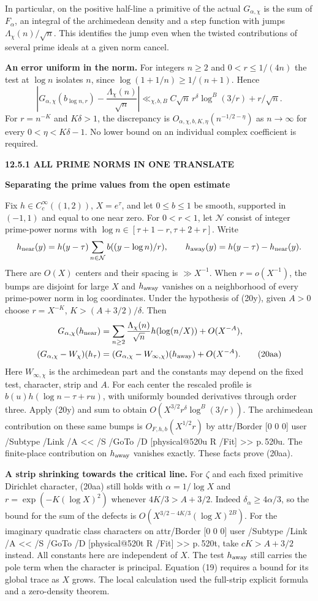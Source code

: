 \documentclass[11pt,letterpaper]{article}
\makeatletter
\newcommand{\rightmarktext}{}
\newcommand{\printfolio}{}
\newcommand{\leaf}[4]{\clearpage\gdef\printfolio{#1}\gdef\rightmarktext{#2}%
  {\small\sffamily\bfseries\color{ink}#3\par}\vspace{3pt}%
  {\LARGE\bfseries #4\par}\vspace{5pt}}
\newcommand{\point}[1]{\par\smallskip\textbf{#1.}\enspace\ignorespaces}
\newcommand{\MusicPDFPageRef}[1]{\pdfpageref\csname physical@#1\endcsname\space\space 0 R}
\newcommand{\pagelink}[2]{\leavevmode\pdfstartlink attr{/Border [0 0 0]} user{%
  /Subtype /Link /A << /S /GoTo /D [\MusicPDFPageRef{#1} /Fit] >>}%
  {\color{ink}#2}\pdfendlink}
\newcommand{\pg}[1]{\pagelink{#1}{p.\,#1}}
\makeatother
\begin{document}
In particular, on the positive half-line a primitive of the actual
$G_{\alpha,\chi}$ is the sum of $F_\alpha$, an integral of the
archimedean density and a step function with jumps
$\Lambda_\chi(n)/\sqrt n$. This identifies the jump even when the
twisted contributions of several prime ideals at a given norm cancel.

\point{An error uniform in the norm}
For integers $n\ge2$ and $0<r\le1/(4n)$ the test at $\log n$
isolates $n$, since $\log(1+1/n)\ge1/(n+1)$. Hence
\[
 \left|G_{\alpha,\chi}(b_{\log n,r})-\frac{\Lambda_\chi(n)}{\sqrt n}\right|
 \ll_{\chi,b,B} C\sqrt n\,r^\delta\log^B(3/r)+r/\sqrt n .
\]
For $r=n^{-K}$ and $K\delta>1$, the discrepancy is
$O_{\alpha,\chi,b,K,\eta}(n^{-1/2-\eta})$ as $n\to\infty$ for every
$0<\eta<K\delta-1$. No lower bound on an individual complex
coefficient is required.

\leaf{520v}{The complementary test}{12.5.1 \quad ALL PRIME NORMS IN ONE TRANSLATE}{Separating the prime values from the open estimate}
Fix $h\in C_c^\infty((1,2))$, $X=e^\tau$, and let $0\le b\le1$ be
smooth, supported in $(-1,1)$ and equal to one near zero. For $0<r<1$,
let $\mathcal N$ consist of integer prime-power norms with
$\log n\in[\tau+1-r,\tau+2+r]$. Write
\[
 h_{\rm near}(y)=h(y-\tau)\sum_{n\in\mathcal N}b((y-\log n)/r),
 \qquad h_{\rm away}(y)=h(y-\tau)-h_{\rm near}(y).
\]
There are $O(X)$ centers and their spacing is $\gg X^{-1}$.
When $r=o(X^{-1})$, the bumps are disjoint for large $X$ and
$h_{\rm away}$ vanishes on a neighborhood of every prime-power norm
in log coordinates. Under the hypothesis of (20y), given $A>0$ choose
$r=X^{-K}$, $K>(A+3/2)/\delta$. Then
\begin{align*}
 G_{\alpha,\chi}(h_{\rm near})
   &=\sum_{n\ge2}\frac{\Lambda_\chi(n)}{\sqrt n}h(\log(n/X))+O(X^{-A}),\\
 (G_{\alpha,\chi}-W_\chi)(h_\tau)
   &=(G_{\alpha,\chi}-W_{\infty,\chi})(h_{\rm away})+O(X^{-A}).
 \tag{20aa}
\end{align*}
Here $W_{\infty,\chi}$ is the archimedean part and the constants may
depend on the fixed test, character, strip and $A$. For each center
the rescaled profile is $b(u)h(\log n-\tau+ru)$, with uniformly
bounded derivatives through order three. Apply (20y) and sum to obtain
$O(X^{3/2}r^\delta\log^B(3/r))$. The archimedean contribution on
these same bumps is $O_{F,h,b}(X^{1/2}r)$ by \pg{520u}. The finite-place
contribution on $h_{\rm away}$ vanishes exactly. These facts prove (20aa).

\point{A strip shrinking towards the critical line}
For $\zeta$ and each fixed primitive Dirichlet character, (20aa) still
holds with $\alpha=1/\log X$ and $r=\exp(-K(\log X)^2)$ whenever
$4K/3>A+3/2$. Indeed $\delta_\alpha\ge4\alpha/3$, so the bound for
the sum of the defects is $O(X^{3/2-4K/3}(\log X)^{2B})$.
For the imaginary quadratic class characters on \pg{520t}, take
$cK>A+3/2$ instead. All constants here are independent of $X$.
The test $h_{\rm away}$ still carries the pole term when the character
is principal. Equation (19) requires a bound for its global trace as
$X$ grows. The local calculation used the full-strip explicit formula
and a zero-density theorem.
\end{document}

